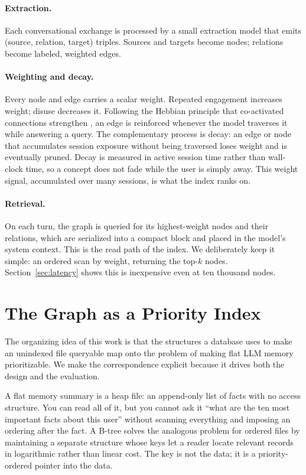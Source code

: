 \documentclass[11pt]{article}
\begin{document}
\paragraph{Extraction.} Each conversational exchange is processed by a small extraction model that emits (source, relation, target) triples. Sources and targets become nodes; relations become labeled, weighted edges.

\paragraph{Weighting and decay.} Every node and edge carries a scalar weight. Repeated engagement increases weight; disuse decreases it. Following the Hebbian principle that co-activated connections strengthen \citep{hebb1949organization}, an edge is reinforced whenever the model traverses it while answering a query. The complementary process is decay: an edge or node that accumulates session exposure without being traversed loses weight and is eventually pruned. Decay is measured in active session time rather than wall-clock time, so a concept does not fade while the user is simply away. This weight signal, accumulated over many sessions, is what the index ranks on.

\paragraph{Retrieval.} On each turn, the graph is queried for its highest-weight nodes and their relations, which are serialized into a compact block and placed in the model's system context. This is the read path of the index. We deliberately keep it simple: an ordered scan by weight, returning the top-$k$ nodes. Section~\ref{sec:latency} shows this is inexpensive even at ten thousand nodes.

\section{The Graph as a Priority Index}
\label{sec:framing}

The organizing idea of this work is that the structures a database uses to make an unindexed file queryable map onto the problem of making flat LLM memory prioritizable. We make the correspondence explicit because it drives both the design and the evaluation.

A flat memory summary is a heap file: an append-only list of facts with no access structure. You can read all of it, but you cannot ask it ``what are the ten most important facts about this user'' without scanning everything and imposing an ordering after the fact. A B-tree \citep{bayer1972organization} solves the analogous problem for ordered files by maintaining a separate structure whose keys let a reader locate relevant records in logarithmic rather than linear cost. The key is not the data; it is a priority-ordered pointer into the data.
\end{document}
